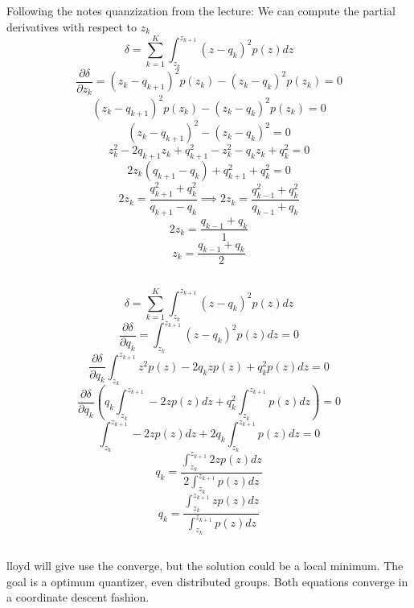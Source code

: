 \documentclass[12pt]{article}
\begin{document}
\subsection{}
Following the notes quanzization from the lecture: We can compute the partial derivatives with respect to $z_{k}$
\[ \delta = \sum_{k=1}^{K} \int_{z_{k}}^{z_{k+1}} (z-q_{k})^2p(z) dz  \]
\[ \frac{\partial \delta}{\partial z_{k}} = (z_{k} - q_{k+1})^2 p(z_{k}) - (z_{k} - q_{k})^2 p(z_{k}) = 0\]
\[ (z_{k} - q_{k+1})^2 p(z_{k}) - (z_{k} - q_{k})^2 p(z_{k}) = 0\]
\[ (z_{k} - q_{k+1})^2 - (z_{k} - q_{k})^2 = 0\]
\[ z_{k}^2 - 2 q_{k+1} z_{k} + q_{k+1}^2 - z_{k}^2 - q_{k}z_{k} + q_{k}^2 = 0\]
\[ 2 z_{k} ( q_{k+1} - q_{k} ) + q_{k+1}^2 + q_{k}^2 = 0\]
\[ 2 z_{k} = \frac{q_{k+1}^2 + q_{k}^2}{q_{k+1} - q_{k}} \implies 2 z_{k} = \frac{q_{k-1}^2 + q_{k}^2}{q_{k-1} + q_{k}} \]
\[ 2 z_{k} = \frac{q_{k-1} + q_{k}}{1} \]
\[ z_{k} = \frac{q_{k-1} + q_{k}}{2} \]
\subsection{}
\[ \delta = \sum_{k=1}^{K} \int_{z_{k}}^{z_{k+1}} (z-q_{k})^2p(z) dz  \]
\[ \frac{\partial \delta}{\partial q_{k}} = \int_{z_{k}}^{z_{k+1}} (z-q_{k})^2p(z) dz = 0\]
\[ \frac{\partial \delta}{\partial q_{k}} \int_{z_{k}}^{z_{k+1}} z^2 p(z) - 2q_{k}z p(z)  + q_{k}^2 p(z) dz = 0\]
\[ \frac{\partial \delta}{\partial q_{k}} (q_{k} \int_{z_{k}}^{z_{k+1}} - 2z p(z) dz + q_{k}^2 \int_{z_{k}}^{z_{k+1}} p(z) dz) = 0\]
\[ \int_{z_{k}}^{z_{k+1}} - 2z p(z) dz + 2q_{k} \int_{z_{k}}^{z_{k+1}} p(z) dz = 0\]
\[ q_{k} = \frac{\int_{z_{k}}^{z_{k+1}} 2z p(z) dz} {2 \int_{z_{k}}^{z_{k+1}} p(z) dz}\]
\[ q_{k} = \frac{\int_{z_{k}}^{z_{k+1}} z p(z) dz}{\int_{z_{k}}^{z_{k+1}} p(z) dz}\]

\subsection{}
lloyd  will give use the converge, but the solution could be a local minimum. The goal is a optimum quantizer, even distributed groups.
Both equations converge in a coordinate descent fashion.
\end{document}
